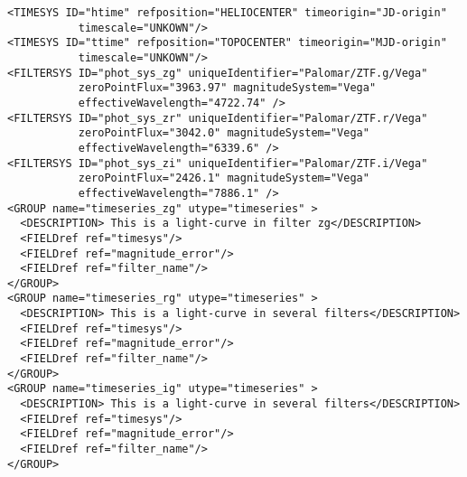 \begin{verbatim}
<TIMESYS ID="htime" refposition="HELIOCENTER" timeorigin="JD-origin" 
           timescale="UNKOWN"/>
<TIMESYS ID="ttime" refposition="TOPOCENTER" timeorigin="MJD-origin" 
           timescale="UNKOWN"/>
<FILTERSYS ID="phot_sys_zg" uniqueIdentifier="Palomar/ZTF.g/Vega" 
           zeroPointFlux="3963.97" magnitudeSystem="Vega" 
           effectiveWavelength="4722.74" />
<FILTERSYS ID="phot_sys_zr" uniqueIdentifier="Palomar/ZTF.r/Vega" 
           zeroPointFlux="3042.0" magnitudeSystem="Vega" 
           effectiveWavelength="6339.6" />
<FILTERSYS ID="phot_sys_zi" uniqueIdentifier="Palomar/ZTF.i/Vega" 
           zeroPointFlux="2426.1" magnitudeSystem="Vega" 
           effectiveWavelength="7886.1" />
<GROUP name="timeseries_zg" utype="timeseries" > 
  <DESCRIPTION> This is a light-curve in filter zg</DESCRIPTION>
  <FIELDref ref="timesys"/>
  <FIELDref ref="magnitude_error"/>
  <FIELDref ref="filter_name"/>
</GROUP>
<GROUP name="timeseries_rg" utype="timeseries" > 
  <DESCRIPTION> This is a light-curve in several filters</DESCRIPTION>
  <FIELDref ref="timesys"/>
  <FIELDref ref="magnitude_error"/>
  <FIELDref ref="filter_name"/>
</GROUP>
<GROUP name="timeseries_ig" utype="timeseries" > 
  <DESCRIPTION> This is a light-curve in several filters</DESCRIPTION>
  <FIELDref ref="timesys"/>
  <FIELDref ref="magnitude_error"/>
  <FIELDref ref="filter_name"/>
</GROUP>
\end{verbatim}

